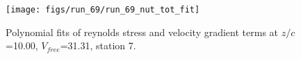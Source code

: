 \begin{figure}[H]
\centering
\texttt{[image: figs/run\_69/run\_69\_nut\_tot\_fit]}
\caption{Polynomial fits of reynolds stress and velocity gradient terms at $z/c$=10.00, $V_{free}$=31.31, station 7.}
\label{fig:run_69_nut_tot_fit}
\end{figure}


